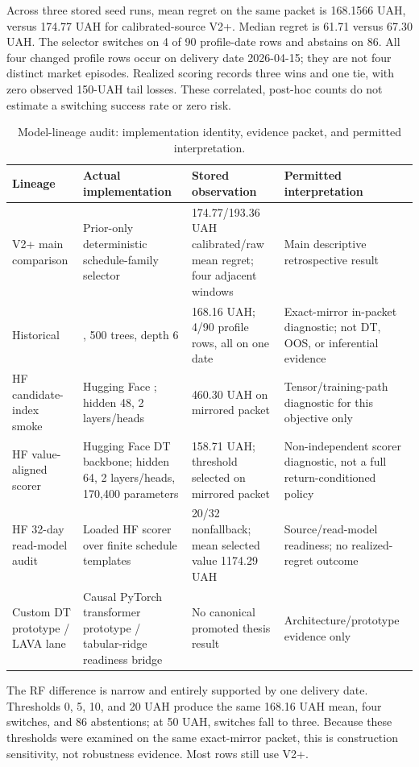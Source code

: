 Across three stored seed runs, mean regret on the same packet is 168.1566 UAH, versus 174.77 UAH for calibrated-source V2+. Median regret is 61.71 versus 67.30 UAH. The selector switches on 4 of 90 profile-date rows and abstains on 86. All four changed profile rows occur on delivery date 2026-04-15; they are not four distinct market episodes. Realized scoring records three wins and one tie, with zero observed 150-UAH tail losses. These correlated, post-hoc counts do not estimate a switching success rate or zero risk.

\begin{table}[t]
\centering
\caption{Model-lineage audit: implementation identity, evidence packet, and permitted interpretation.}
\label{tab:05:results:6}
\small
\begin{tabularx}{\textwidth}{@{}YYYY@{}}
\toprule
Lineage & Actual implementation & Stored observation & Permitted interpretation \\
\midrule
V2+ main comparison & Prior-only deterministic schedule-family selector & 174.77/193.36 UAH calibrated/raw mean regret; four adjacent windows & Main descriptive retrospective result \\
Historical  & , 500 trees, depth 6 & 168.16 UAH; 4/90 profile rows, all on one date & Exact-mirror in-packet diagnostic; not DT, OOS, or inferential evidence \\
HF candidate-index smoke & Hugging Face ; hidden 48, 2 layers/heads & 460.30 UAH on mirrored packet & Tensor/training-path diagnostic for this objective only \\
HF value-aligned scorer & Hugging Face DT backbone; hidden 64, 2 layers/heads, 170,400 parameters & 158.71 UAH; threshold selected on mirrored packet & Non-independent scorer diagnostic, not a full return-conditioned policy \\
HF 32-day read-model audit & Loaded HF scorer over finite schedule templates & 20/32 nonfallback; mean selected value 1174.29 UAH & Source/read-model readiness; no realized-regret outcome \\
Custom DT prototype / LAVA lane & Causal PyTorch transformer prototype / tabular-ridge readiness bridge & No canonical promoted thesis result & Architecture/prototype evidence only \\
\bottomrule
\end{tabularx}
\end{table}

The RF difference is narrow and entirely supported by one delivery date. Thresholds 0, 5, 10, and 20 UAH produce the same 168.16 UAH mean, four switches, and 86 abstentions; at 50 UAH, switches fall to three. Because these thresholds were examined on the same exact-mirror packet, this is construction sensitivity, not robustness evidence. Most rows still use V2+.


